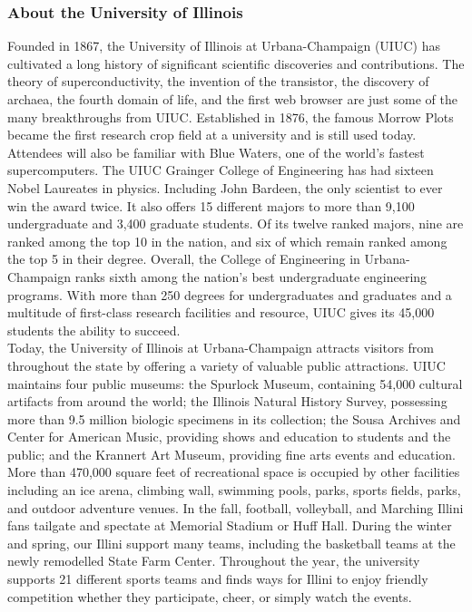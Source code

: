 \subsubsection{About the University of Illinois}
Founded in 1867, the University of Illinois at Urbana-Champaign (UIUC) has cultivated a long history of significant scientific discoveries and contributions. The theory of superconductivity, the invention of the transistor, the discovery of archaea, the fourth domain of life, and the first web browser are just some of the many breakthroughs from UIUC. Established in 1876, the famous Morrow Plots became the first research crop field at a university and is still used today. Attendees will also be familiar with Blue Waters, one of the world’s fastest supercomputers. 
The UIUC Grainger College of Engineering has had sixteen Nobel Laureates in physics. Including John Bardeen, the only scientist to ever win the award twice. It also offers 15 different majors to more than 9,100 undergraduate and 3,400 graduate students. Of its twelve ranked majors, nine are ranked among the top 10 in the nation, and six of which remain ranked among the top 5 in their degree. Overall, the College of Engineering in Urbana-Champaign ranks sixth among the nation’s best undergraduate engineering programs. With more than 250 degrees for undergraduates and graduates and a multitude of first-class research facilities and resource, UIUC gives its 45,000 students the ability to succeed.\\
Today, the University of Illinois at Urbana-Champaign attracts visitors from throughout the state by offering a variety of valuable public attractions. UIUC maintains four public museums: the Spurlock Museum, containing 54,000 cultural artifacts from around the world; the Illinois Natural History Survey, possessing more than 9.5 million biologic specimens in its collection; the Sousa Archives and Center for American Music, providing shows and education to students and the public; and the Krannert Art Museum, providing fine arts events and education. More than 470,000 square feet of recreational space is occupied by other facilities including an ice arena, climbing wall, swimming pools, parks, sports fields, parks, and outdoor adventure venues. In the fall, football, volleyball, and Marching Illini fans tailgate and spectate at Memorial Stadium or Huff Hall. During the winter and spring, our Illini support many teams, including the basketball teams at the newly remodelled State Farm Center. Throughout the year, the university supports 21 different sports teams and finds ways for Illini to enjoy friendly competition whether they participate, cheer, or simply watch the events.

